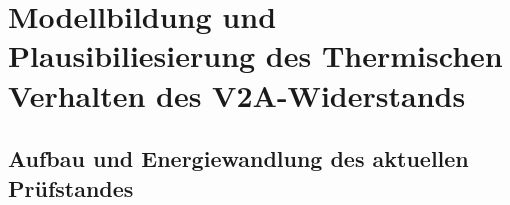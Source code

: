 \section{Modellbildung und Plausibiliesierung des Thermischen Verhalten des V2A-Widerstands}
\label{chap:modellierung_thermischer_widerstand}


\subsection{Aufbau und Energiewandlung des aktuellen Prüfstandes}
\label{sec:aufbau_ist_zustand}